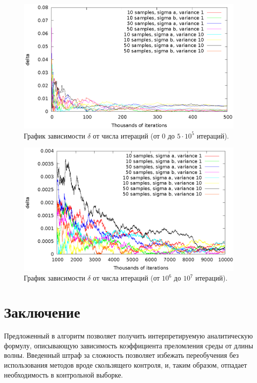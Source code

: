 \documentclass[12pt,a4paper]{article}
\begin{document}
\begin{figure}[h]
  \centering
  \includegraphics[scale=1.2]{figs/classic/variance_all_0_500.eps}
  \caption{График зависимости $\delta$ от числа итераций (от 0 до $5 \cdot 10^5$ итераций).}
  \label{fig:classic_all_0_500}
\end{figure}

\begin{figure}[h]
  \centering
  \includegraphics[scale=1.2]{figs/classic/variance_all_1000_all.eps}
  \caption{График зависимости $\delta$ от числа итераций (от $10^6$ до $10^7$ итераций).}
  \label{fig:classic_all_1000_all}
\end{figure}

\section{Заключение}

Предложенный в \cite{Rudoy13} алгоритм позволяет получить интерпретируемую аналитическую
формулу, описывающую зависимость коэффициента преломления среды от длины волны.
Введенный штраф за сложность позволяет избежать переобучения без использования методов
вроде скользящего контроля, и, таким образом, отпадает необходимость в контрольной выборке.
\end{document}
